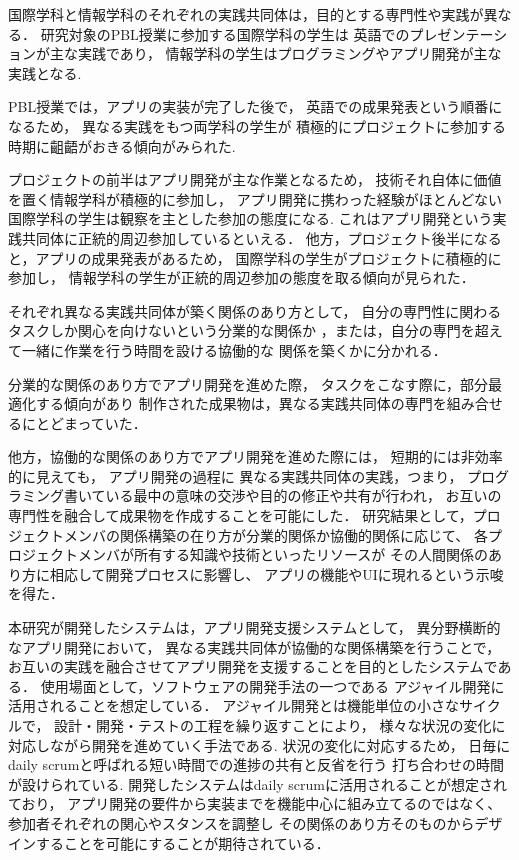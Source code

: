\documentclass[submit,techrep]{ipsj}
\begin{document}
国際学科と情報学科のそれぞれの実践共同体は，目的とする専門性や実践が異なる．
研究対象のPBL授業に参加する国際学科の学生は
英語でのプレゼンテーションが主な実践であり，
情報学科の学生はプログラミングやアプリ開発が主な実践となる.
　

PBL授業では，アプリの実装が完了した後で，
英語での成果発表という順番になるため，
異なる実践をもつ両学科の学生が
積極的にプロジェクトに参加する時期に齟齬がおきる傾向がみられた.


プロジェクトの前半はアプリ開発が主な作業となるため，
技術それ自体に価値を置く情報学科が積極的に参加し，
アプリ開発に携わった経験がほとんどない国際学科の学生は観察を主とした参加の態度になる.
これはアプリ開発という実践共同体に正統的周辺参加しているといえる．
他方，プロジェクト後半になると，アプリの成果発表があるため，
国際学科の学生がプロジェクトに積極的に参加し，
情報学科の学生が正統的周辺参加の態度を取る傾向が見られた．

それぞれ異なる実践共同体が築く関係のあり方として，
自分の専門性に関わるタスクしか関心を向けないという分業的な関係か
，または，自分の専門を超えて一緒に作業を行う時間を設ける協働的な
関係を築くかに分かれる．


分業的な関係のあり方でアプリ開発を進めた際，
タスクをこなす際に，部分最適化する傾向があり
制作された成果物は，異なる実践共同体の専門を組み合せるにとどまっていた．

他方，協働的な関係のあり方でアプリ開発を進めた際には，
短期的には非効率的に見えても，
アプリ開発の過程に
異なる実践共同体の実践，つまり，
プログラミング書いている最中の意味の交渉や目的の修正や共有が行われ，
お互いの専門性を融合して成果物を作成することを可能にした．
研究結果として，プロジェクトメンバの関係構築の在り方が分業的関係か協働的関係に応じて、
各プロジェクトメンバが所有する知識や技術といったリソースが
その人間関係のあり方に相応して開発プロセスに影響し、
アプリの機能やUIに現れるという示唆を得た．


本研究が開発したシステムは，アプリ開発支援システムとして，
異分野横断的なアプリ開発において，
異なる実践共同体が協働的な関係構築を行うことで，
お互いの実践を融合させてアプリ開発を支援することを目的としたシステムである．
使用場面として，ソフトウェアの開発手法の一つである
アジャイル開発に活用されることを想定している．
アジャイル開発とは機能単位の小さなサイクルで，
設計・開発・テストの工程を繰り返すことにより，
様々な状況の変化に対応しながら開発を進めていく手法である.
状況の変化に対応するため，
日毎にdaily scrumと呼ばれる短い時間での進捗の共有と反省を行う
打ち合わせの時間が設けられている.
開発したシステムはdaily scrumに活用されることが想定されており，
アプリ開発の要件から実装までを機能中心に組み立てるのではなく、
参加者それぞれの関心やスタンスを調整し
その関係のあり方そのものからデザインすることを可能にすることが期待されている．
\end{document}
